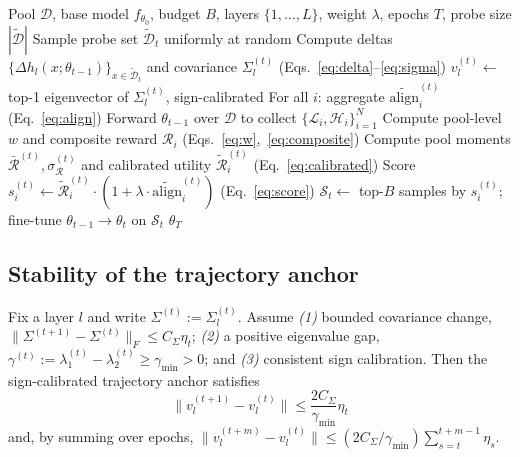 \begin{algorithm}[t]
\caption{Trajectory-Anchored Dynamic Selection (TADS)}
\label{alg:tads}
\begin{algorithmic}[1]
\REQUIRE Pool $\mathcal{D}$, base model $f_{\theta_0}$, budget $B$,
         layers $\{1,\ldots,L\}$, weight $\lambda$, epochs $T$, probe
         size $|\widetilde{\mathcal{D}}|$
  \STATE Sample probe set $\widetilde{\mathcal{D}}_t$ uniformly at random
    \STATE Compute deltas
           $\{\Delta h_l(x; \theta_{t-1})\}_{x \in \widetilde{\mathcal{D}}_t}$
           and covariance $\Sigma_l^{(t)}$
           \hfill (Eqs.~\ref{eq:delta}--\ref{eq:sigma})
    \STATE $v_l^{(t)} \leftarrow$ top-1 eigenvector of
           $\Sigma_l^{(t)}$, sign-calibrated
  \ENDFOR
  \STATE For all $i$: aggregate $\widetilde{\mathrm{align}}_i^{(t)}$
         \hfill (Eq.~\ref{eq:align})
  \STATE Forward $\theta_{t-1}$ over $\mathcal{D}$ to collect
         $\{\mathcal{L}_i, \mathcal{H}_i\}_{i=1}^N$
  \STATE Compute pool-level $w$ and composite reward
         $\mathcal{R}_i$
         \hfill (Eqs.~\ref{eq:w},~\ref{eq:composite})
  \STATE Compute pool moments
         $\bar{\mathcal{R}}^{(t)}, \sigma_{\mathcal{R}}^{(t)}$ and
         calibrated utility $\tilde{\mathcal{R}}_i^{(t)}$
         \hfill (Eq.~\ref{eq:calibrated})
  \STATE Score
         $s_i^{(t)} \leftarrow
          \tilde{\mathcal{R}}_i^{(t)} \cdot
          (1 + \lambda \cdot \widetilde{\mathrm{align}}_i^{(t)})$
         \hfill (Eq.~\ref{eq:score})
  \STATE $\mathcal{S}_t \leftarrow$ top-$B$ samples by $s_i^{(t)}$;
         fine-tune $\theta_{t-1} \to \theta_t$ on $\mathcal{S}_t$
\ENDFOR
\RETURN $\theta_T$
\end{algorithmic}
\end{algorithm}

\subsection{Stability of the trajectory anchor}
\label{sec:method-theory}

\begin{theorem}
\label{thm:stability}
Fix a layer $l$ and write $\Sigma^{(t)} := \Sigma_l^{(t)}$. Assume
\emph{(1)} bounded covariance change,
$\|\Sigma^{(t+1)}-\Sigma^{(t)}\|_F \le C_\Sigma \eta_t$;
\emph{(2)} a positive eigenvalue gap,
$\gamma^{(t)} := \lambda_1^{(t)}-\lambda_2^{(t)}
\ge \gamma_{\min}>0$; and \emph{(3)} consistent sign calibration.
Then the sign-calibrated trajectory anchor satisfies
\begin{equation}
  \boxed{\bigl\|v_l^{(t+1)}-v_l^{(t)}\bigr\|
  \le \frac{2C_\Sigma}{\gamma_{\min}}\eta_t}
  \label{eq:stability-bound}
\end{equation}
and, by summing over epochs,
$\|v_l^{(t+m)}-v_l^{(t)}\| \le (2C_\Sigma/\gamma_{\min})
\sum_{s=t}^{t+m-1}\eta_s.$
\end{theorem}

